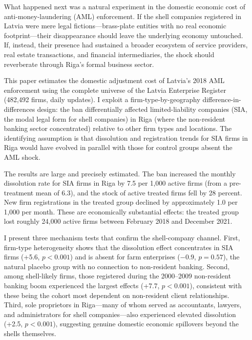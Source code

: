 \documentclass[12pt]{article}
\begin{document}
What happened next was a natural experiment in the domestic economic cost of anti-money-laundering (AML) enforcement. If the shell companies registered in Latvia were mere legal fictions---brass-plate entities with no real economic footprint---their disappearance should leave the underlying economy untouched. If, instead, their presence had sustained a broader ecosystem of service providers, real estate transactions, and financial intermediaries, the shock should reverberate through Riga's formal business sector.

This paper estimates the domestic adjustment cost of Latvia's 2018 AML enforcement using the complete universe of the Latvia Enterprise Register (482,492 firms, daily updates). I exploit a firm-type-by-geography difference-in-differences design: the ban differentially affected limited-liability companies (SIA, the modal legal form for shell companies) in Riga (where the non-resident banking sector concentrated) relative to other firm types and locations. The identifying assumption is that dissolution and registration trends for SIA firms in Riga would have evolved in parallel with those for control groups absent the AML shock.

The results are large and precisely estimated. The ban increased the monthly dissolution rate for SIA firms in Riga by 7.5 per 1,000 active firms (from a pre-treatment mean of 6.3), and the stock of active treated firms fell by 28 percent. New firm registrations in the treated group declined by approximately 1.0 per 1,000 per month. These are economically substantial effects: the treated group lost roughly 24,000 active firms between February 2018 and December 2021.

I present three mechanism tests that confirm the shell-company channel. First, firm-type heterogeneity shows that the dissolution effect concentrates in SIA firms (+5.6, $p < 0.001$) and is absent for farm enterprises ($-0.9$, $p = 0.57$), the natural placebo group with no connection to non-resident banking. Second, among shell-likely firms, those registered during the 2000--2009 non-resident banking boom experienced the largest effects (+7.7, $p < 0.001$), consistent with these being the cohort most dependent on non-resident client relationships. Third, sole proprietors in Riga---many of whom served as accountants, lawyers, and administrators for shell companies---also experienced elevated dissolution (+2.5, $p < 0.001$), suggesting genuine domestic economic spillovers beyond the shells themselves.
\end{document}

